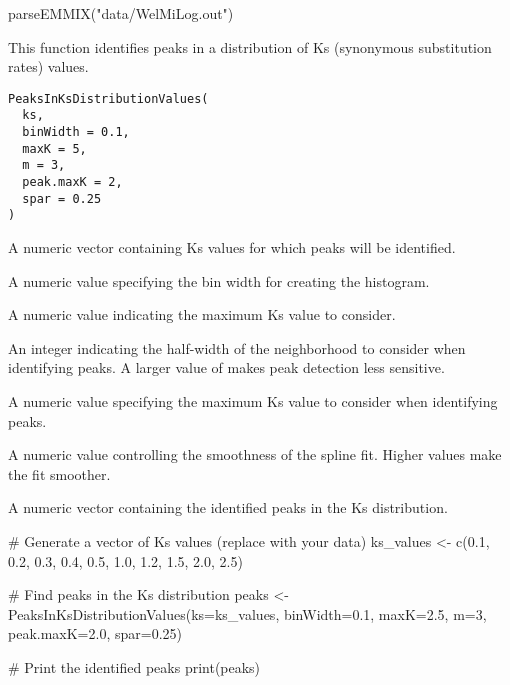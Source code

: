\documentclass[a4paper]{book}
\begin{document}
%
\begin{Examples}
\begin{ExampleCode}
parseEMMIX("data/WelMiLog.out")
\end{ExampleCode}
\end{Examples}
%
\begin{Description}\relax
This function identifies peaks in a distribution of Ks (synonymous substitution rates) values.
\end{Description}
%
\begin{Usage}
\begin{verbatim}
PeaksInKsDistributionValues(
  ks,
  binWidth = 0.1,
  maxK = 5,
  m = 3,
  peak.maxK = 2,
  spar = 0.25
)
\end{verbatim}
\end{Usage}
%
\begin{Arguments}
\begin{ldescription}
\item[\code{ks}] A numeric vector containing Ks values for which peaks will be identified.

\item[\code{binWidth}] A numeric value specifying the bin width for creating the histogram.

\item[\code{maxK}] A numeric value indicating the maximum Ks value to consider.

\item[\code{m}] An integer indicating the half-width of the neighborhood to consider when identifying peaks. A larger value of  makes peak detection less sensitive.

\item[\code{peak.maxK}] A numeric value specifying the maximum Ks value to consider when identifying peaks.

\item[\code{spar}] A numeric value controlling the smoothness of the spline fit. Higher values make the fit smoother.
\end{ldescription}
\end{Arguments}
%
\begin{Value}
A numeric vector containing the identified peaks in the Ks distribution.
\end{Value}
%
\begin{Examples}
\begin{ExampleCode}
# Generate a vector of Ks values (replace with your data)
ks_values <- c(0.1, 0.2, 0.3, 0.4, 0.5, 1.0, 1.2, 1.5, 2.0, 2.5)

# Find peaks in the Ks distribution
peaks <- PeaksInKsDistributionValues(ks=ks_values, binWidth=0.1, maxK=2.5, m=3, peak.maxK=2.0, spar=0.25)

# Print the identified peaks
print(peaks)
\end{ExampleCode}
\end{Examples}
\end{document}
